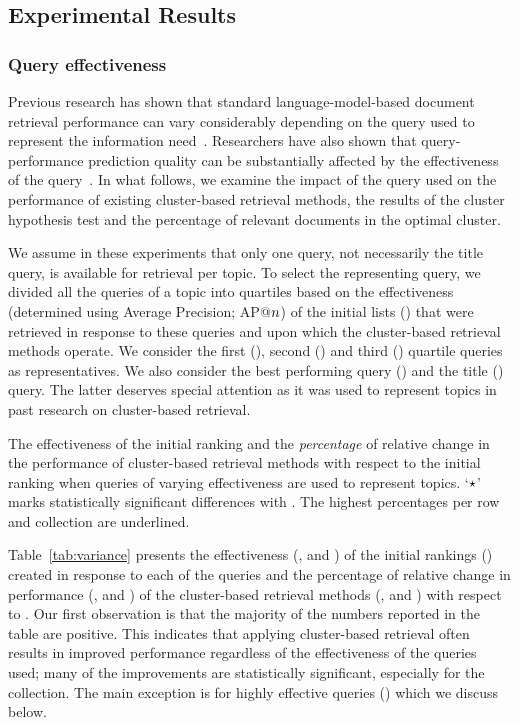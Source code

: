 \subsection{Experimental Results}
\label{sec:results}

\subsubsection{Query effectiveness}
Previous research has shown that standard language-model-based document retrieval performance can vary considerably depending on the query used to represent the information need~\cite{Lu+al:19a,Zendel+al:19a}. Researchers have also shown that query-performance prediction quality can be substantially affected by the effectiveness of the query~\cite{Zendel+al:19a}. In what follows, we examine the impact of the query used on the performance of existing cluster-based retrieval methods, the results of the cluster hypothesis test and the percentage of relevant documents in the optimal cluster. 

We assume in these experiments that only one query, not necessarily the title query, is available for retrieval per topic. To select the representing query, we divided all the queries of a topic into quartiles based on the effectiveness (determined using Average Precision; AP@$n$) of the initial lists (\init) that were retrieved in response to these queries and upon which the cluster-based retrieval methods operate. We consider the first (\qOneAP), second (\medAP) and third (\qThreeAP) quartile queries as representatives. We also consider the best performing query (\maxAP) and the title (\titleQuery) query. The latter deserves special attention as it was used to represent topics in past research on cluster-based retrieval.


\begin{table}[t]
\caption{\label{tab:variance}The effectiveness of the initial ranking and the \emph{percentage} of relative change in the performance of cluster-based retrieval methods with respect to the initial ranking when queries of varying effectiveness are used to represent topics. `$\star$' marks statistically significant differences with \init. The highest percentages per row and collection are underlined.}

\end{table}

Table~\ref{tab:variance} presents the effectiveness  (\map, \precFive and \ndcg) of the initial rankings (\init) created in response to each of the queries and the percentage of relative change in performance (\diffp{\map}, \diffp{\precFive} and \diffp{\ndcg}) of the cluster-based retrieval methods (\clustMRF, \geoClust and \interp) with respect to \init.
Our first observation is that the majority of the numbers reported in the table are positive. This indicates that applying cluster-based retrieval often results in improved performance regardless of the effectiveness of the queries used; many of the improvements are statistically significant, especially for the \robust collection. The main exception is for highly effective queries (\maxAP) which we discuss below. 

